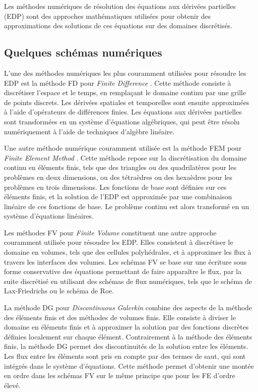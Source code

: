 Les méthodes numériques de résolution des équations aux dérivées partielles (EDP) sont des approches mathématiques utilisées pour obtenir des approximations des solutions de ces équations sur des domaines discrétisés.

\subsection{Quelques schémas numériques}

L'une des méthodes numériques les plus couramment utilisées pour résoudre les EDP est la méthode FD pour \emph{Finite Difference} \cite{forsythe1961finite, smith1985numerical, stummel2006difference}. Cette méthode consiste à discrétiser l'espace et le temps, en remplaçant le domaine continu par une grille de points discrets. Les dérivées spatiales et temporelles sont ensuite approximées à l'aide d'opérateurs de différences finies. Les équations aux dérivées partielles sont transformées en un système d'équations algébriques, qui peut être résolu numériquement à l'aide de techniques d'algèbre linéaire.

Une autre méthode numérique couramment utilisée est la méthode FEM pour \emph{Finite Element Method} \cite{zienkiewicz2005finite, norrie2014finite}. Cette méthode repose sur la discrétisation du domaine continu en éléments finis, tels que des triangles ou des quadrilatères pour les problèmes en deux dimensions, ou des tétraèdres ou des hexaèdres pour les problèmes en trois dimensions. Les fonctions de base sont définies sur ces éléments finis, et la solution de l'EDP est approximée par une combinaison linéaire de ces fonctions de base. Le problème continu est alors transformé en un système d'équations linéaires.

Les méthodes FV pour \emph{Finite Volume} \cite{leveque2002finite, barth2003finite} constituent une autre approche couramment utilisée pour résoudre les EDP. Elles consistent à discrétiser le domaine en volumes, tels que des cellules polyhédrales, et à approximer les flux à travers les interfaces des volumes. Les schémas FV se base sur une écriture sous forme conservative des équations permettant de faire apparaître le flux, par la suite discrétisé en utilisant des schémas de flux numériques, tels que le schéma de Lax-Friedrichs ou le schéma de Roe.

La méthode DG pour \emph{Discontinuous Galerkin} \cite{arnold2000discontinuous, riviere2008discontinuous} combine des aspects de la méthode des éléments finis et des méthodes de volumes finis. Elle consiste à diviser le domaine en éléments finis et à approximer la solution par des fonctions discrètes définies localement sur chaque élément. Contrairement à la méthode des éléments finis, la méthode DG permet des discontinuités de la solution entre les éléments. Les flux entre les éléments sont pris en compte par des termes de saut, qui sont intégrés dans le système d'équations. Cette méthode permet d'obtenir une montée en ordre dans les schémas FV sur le même principe que pour les FE d'ordre élevé.

